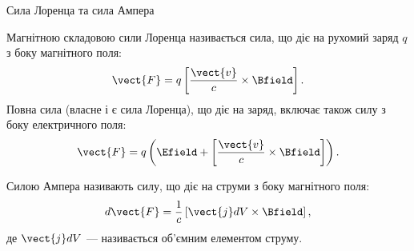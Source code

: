 \documentclass{beamer}
\begin{document}
\begin{frame}{Сила Лоренца та сила Ампера}{}
	\begin{block}{}
		Магнітною складовою сили Лоренца називається сила, що діє на рухомий заряд $q$ з боку магнітного поля:
		\begin{equation*}
			\vect{F} = q\left[\frac{\vect{v}}{c}\times\Bfield\right].
		\end{equation*}
		Повна сила (власне і є сила Лоренца), що діє на заряд, включає також силу з боку електричного поля:
		\begin{equation*}
			\vect{F} = q\left( \Efield + \left[\frac{\vect{v}}{c}\times\Bfield\right] \right) .
		\end{equation*}
	\end{block}
	\begin{block}{}
		\alert{Силою Ампера} називають силу, що діє на струми з боку магнітного поля:
		\begin{equation*}
			d\vect{F} = \frac1c \left[ \vect{j}dV \times \Bfield\right],
		\end{equation*}
		де $\vect{j} dV$ --- називається об'ємним \alert{елементом струму}.
	\end{block}
\end{frame}
\end{document}
